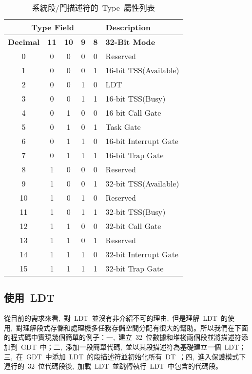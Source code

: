 \begin{itemize}
\begin{center}\begin{longtable}{c|c|c|c|c|l}
\caption[]{系統段/門描述符的~Type~屬性列表}\label{sys_gate_types}\\
\hline
\multicolumn{5}{c|}{\textbf{Type Field}} & \textbf{Description}\bigstrut\\
\hline
\textbf{Decimal} & \textbf{11} & \textbf{10} & \textbf{9} & \textbf{8} & \textbf{32-Bit Mode}\\
\hline
0 & 0 & 0 & 0 & 0 & Reserved\\
1 & 0 & 0 & 0 & 1 & 16-bit TSS(Available)\\
2 & 0 & 0 & 1 & 0 & LDT\\
3 & 0 & 0 & 1 & 1 & 16-bit TSS(Busy)\\
4 & 0 & 1 & 0 & 0 & 16-bit Call Gate\\
5 & 0 & 1 & 0 & 1 & Task Gate\\
6 & 0 & 1 & 1 & 0 & 16-bit Interrupt Gate\\
7 & 0 & 1 & 1 & 1 & 16-bit Trap Gate\\
8 & 1 & 0 & 0 & 0 & Reserved\\
9 & 1 & 0 & 0 & 1 & 32-bit TSS(Available)\\
10 & 1 & 0 & 1 & 0 & Reserved\\
11 & 1 & 0 & 1 & 1 & 32-bit TSS(Busy)\\
12 & 1 & 1 & 0 & 0 & 32-bit Call Gate\\
13 & 1 & 1 & 0 & 1 & Reserved\\
14 & 1 & 1 & 1 & 0 & 32-bit Interrupt Gate\\
15 & 1 & 1 & 1 & 1 & 32-bit Trap Gate\\
\hline
\end{longtable}\end{center}

\end{itemize}

\subsection{使用~LDT~}

從目前的需求來看,~對~LDT~並沒有非介紹不可的理由,~但是理解~LDT~的使用,~對理解段式存儲和處理機多任務存儲空間分配有很大的幫助。所以我們在下面的程式碼中實現幾個簡單的例子：一,~建立~32~位數據和堆棧兩個段並將描述符添加到~GDT~中；二,~添加一段簡單代碼,~並以其段描述符為基礎建立一個~LDT；三,~在~GDT~中添加~LDT~的段描述符並初始化所有~DT~；四,~進入保護模式下運行的~32~位代碼段後,~加載~LDT~並跳轉執行~LDT~中包含的代碼段。

